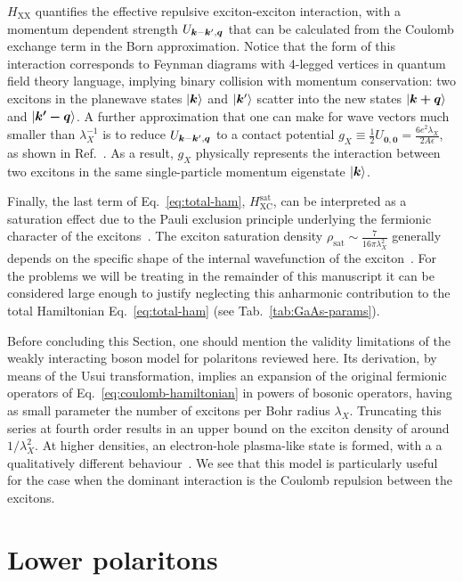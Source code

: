$H_{\text{XX}}$ quantifies the effective repulsive exciton-exciton
interaction, with a momentum dependent strength
$U_{\bm{k} - \bm{k}^{\prime},\bm{q}}$ that can be calculated from the
Coulomb exchange term in the Born approximation.  Notice that the
form of this interaction corresponds to Feynman diagrams with
4-legged vertices in quantum field theory language, implying binary
collision with momentum conservation: two excitons in the planewave
states $\vert \bm{k} \rangle$ and $\vert \bm{k}^{\prime} \rangle$ scatter into the new
states $\vert \bm{\bm{k}+\bm{q}} \rangle$ and $\vert \bm{\bm{k}^{\prime}-\bm{q}} \rangle$.
A further approximation that one can make for wave vectors much
smaller than $\lambda_X^{-1}$ is to reduce
$U_{\bm{k} - \bm{k}^{\prime},\bm{q}}$ to a contact potential
$g_X \equiv \frac{1}{2} U_{\bm{0},\bm{0}} =
\frac{6e^2\lambda_X}{2A\epsilon}$, as shown in
Ref.~\cite{Ciuti1998}. As a result, $g_X$ physically represents the
interaction between two excitons in the same single-particle momentum
eigenstate $\vert \bm{k} \rangle$.

Finally, the last term of Eq.~\eqref{eq:total-ham},
$H_{\text{XC}}^{\text{sat}}$, can be interpreted as a saturation
effect due to the Pauli exclusion principle underlying the fermionic
character of the excitons~\cite{Tassone1999}. The exciton saturation
density $\rho_{\text{sat}} \sim \frac{7}{16\pi\lambda_X^2}$ generally
depends on the specific shape of the internal wavefunction of the
exciton~\cite{Glazov2009}.  For the problems we will be treating in
the remainder of this manuscript it can be considered large enough to
justify neglecting this anharmonic contribution to the total
Hamiltonian Eq.~\eqref{eq:total-ham} (see Tab.~\ref{tab:GaAs-params}).

Before concluding this Section, one should mention the validity
limitations of the weakly interacting boson model for polaritons
reviewed here. Its derivation, by means of the Usui transformation,
implies an expansion of the original fermionic operators of
Eq.~\eqref{eq:coulomb-hamiltonian} in powers of bosonic operators,
having as small parameter the number of excitons per Bohr radius
$\lambda_X$. Truncating this series at fourth order results in an
upper bound on the exciton density of around $1/\lambda_X^2$. At
higher densities, an electron-hole plasma-like state is formed, with a
a qualitatively different behaviour~\cite{COMBESCOT2008}.  We see that
this model is particularly useful for the case when the dominant
interaction is the Coulomb repulsion between the excitons.

\section{Lower polaritons}
\label{sec:lower-polaritons}

